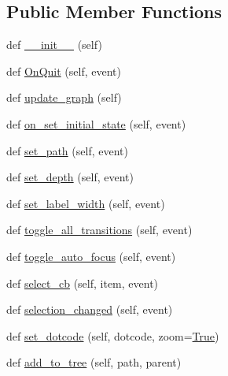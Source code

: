 \subsection*{Public Member Functions}
\begin{DoxyCompactItemize}
\item 
def \hyperlink{classsmacc__viewer_1_1SmaccViewerFrame_a190917c46c5ee67c31da814f099fa044}{\+\_\+\+\_\+init\+\_\+\+\_\+} (self)
\item 
def \hyperlink{classsmacc__viewer_1_1SmaccViewerFrame_ac17b6f807bb4759e8ec87c867ea0622b}{On\+Quit} (self, event)
\item 
def \hyperlink{classsmacc__viewer_1_1SmaccViewerFrame_a3dbf56a66153e99b403fe731ea8a6759}{update\+\_\+graph} (self)
\item 
def \hyperlink{classsmacc__viewer_1_1SmaccViewerFrame_aaaf449c0ca69c46b44de8a40d0faadf6}{on\+\_\+set\+\_\+initial\+\_\+state} (self, event)
\item 
def \hyperlink{classsmacc__viewer_1_1SmaccViewerFrame_a4b253c9dc94a475f795644f8a10301c3}{set\+\_\+path} (self, event)
\item 
def \hyperlink{classsmacc__viewer_1_1SmaccViewerFrame_abef01aa41e1f8fe1c74ee942ec44d7ea}{set\+\_\+depth} (self, event)
\item 
def \hyperlink{classsmacc__viewer_1_1SmaccViewerFrame_afa97fe84879ff60867cc61a80f9fb6f7}{set\+\_\+label\+\_\+width} (self, event)
\item 
def \hyperlink{classsmacc__viewer_1_1SmaccViewerFrame_a4c7e69bdb63f74477ed779d79007f335}{toggle\+\_\+all\+\_\+transitions} (self, event)
\item 
def \hyperlink{classsmacc__viewer_1_1SmaccViewerFrame_a6ca9f14ae1b5d6f1ebac05575536255b}{toggle\+\_\+auto\+\_\+focus} (self, event)
\item 
def \hyperlink{classsmacc__viewer_1_1SmaccViewerFrame_a854f456785aacac8822a9a0f88442303}{select\+\_\+cb} (self, item, event)
\item 
def \hyperlink{classsmacc__viewer_1_1SmaccViewerFrame_ad941286fc80f7a40a0adcc6ff839065c}{selection\+\_\+changed} (self, event)
\item 
def \hyperlink{classsmacc__viewer_1_1SmaccViewerFrame_ad10d7cac9a3e4c49d23ed1bc8f661b5f}{set\+\_\+dotcode} (self, dotcode, zoom=\hyperlink{namespacesmacc__viewer_a48e3092f51d8fc570fcb3d6c76e27f3b}{True})
\item 
def \hyperlink{classsmacc__viewer_1_1SmaccViewerFrame_a3ddd810ff5821fd93f52c4762bd0d151}{add\+\_\+to\+\_\+tree} (self, path, parent)
\item 

\end{DoxyCompactItemize}
